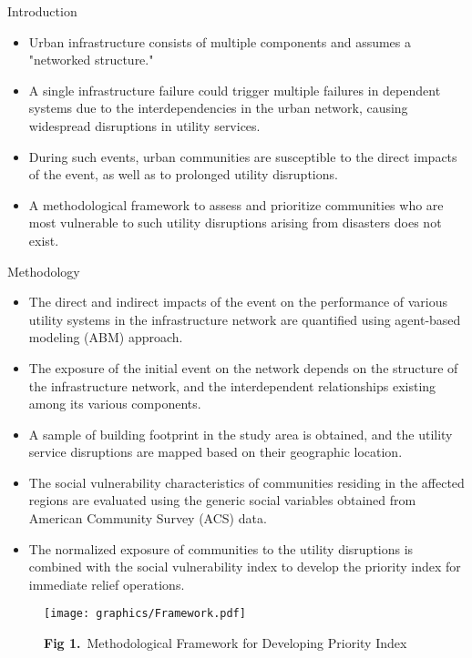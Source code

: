 \documentclass[ctrsize,landscape]{baposter}
\begin{document}
\begin{poster}
\begin{posterbox}[name=intro,column=0,row=0]{Introduction}
\begin{itemize}
  \item Urban infrastructure consists of multiple components and assumes a "networked structure."
  \item A single infrastructure failure could trigger multiple failures in dependent systems due to the interdependencies in the urban network, causing widespread disruptions in utility services.
  \item During such events, urban communities are susceptible to the direct impacts of the event, as well as to prolonged utility disruptions.
  \item A methodological framework to assess and prioritize communities who are most vulnerable to such utility disruptions arising from disasters does not exist.
\end{itemize}
\end{posterbox}

\begin{posterbox}[name=usage,column=0,below=intro]{Methodology}
    \begin{itemize}
        \item The direct and indirect impacts of the event on the performance of various utility systems in the infrastructure network are quantified using agent-based modeling (ABM) approach. 
        \item The exposure of the initial event on the network depends on the structure of the infrastructure network, and the interdependent relationships existing among its various components.
        \item A sample of building footprint in the study area is obtained, and the utility service disruptions are mapped based on their geographic location.
        \item The social vulnerability characteristics of communities residing in the affected regions are evaluated using the generic social variables obtained from American Community Survey (ACS) data.
        \item The normalized exposure of communities to the utility disruptions is combined with the social vulnerability index to develop the priority index for immediate relief operations.
    \end{itemize}
    
    \begin{figure}[H]
    \captionsetup{justification=raggedright, singlelinecheck=false}
    \hspace*{2cm}  \texttt{[image: graphics/Framework.pdf]}
    \caption*{\scriptsize \textcolor{utblack}{\hspace*{2cm}  {\textbf{Fig 1.}~Methodological Framework for Developing Priority Index}}}
      \label{fig:Framework}
    \end{figure}
    

\end{posterbox}
\end{poster}
\end{document}
